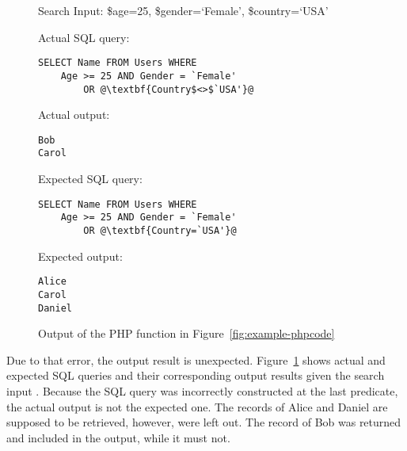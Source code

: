\begin{figure}[t]
    \centering
    \small
\begin{minipage}[t]{0.985\columnwidth}
Search Input: \textsf{\$age=25, \$gender=`Female', \$country=`USA'}
\end{minipage}

\vspace{4pt}
\begin{minipage}[t]{0.63\columnwidth}
Actual SQL query:
\begin{lstlisting}[numbers=none,xleftmargin=4pt]
SELECT Name FROM Users WHERE
    Age >= 25 AND Gender = `Female'
        OR @\textbf{Country$<>$`USA'}@
\end{lstlisting}
\end{minipage}
\hspace{0.03\columnwidth}
\begin{minipage}[t]{0.30\columnwidth}
Actual output:
\begin{lstlisting}[numbers=none,xleftmargin=4pt]
Bob
Carol
\end{lstlisting}
\end{minipage}

\begin{minipage}[t]{0.63\columnwidth}
Expected SQL query:
\begin{lstlisting}[numbers=none,xleftmargin=4pt]
SELECT Name FROM Users WHERE
    Age >= 25 AND Gender = `Female'
        OR @\textbf{Country=`USA'}@
\end{lstlisting}
\end{minipage}
\hspace{0.03\columnwidth}
\begin{minipage}[t]{0.30\columnwidth}
Expected output:
\begin{lstlisting}[numbers=none,xleftmargin=4pt]
Alice
Carol
Daniel
\end{lstlisting}
\end{minipage}
%
    \caption{Output of the PHP function in Figure~\ref{fig:example-phpcode}~\cite{icsm13}}\label{fig:example-output}
\end{figure}


Due to that error, the output result is
unexpected. Figure~\ref{fig:example-output} shows actual and expected
SQL queries and their corresponding output results given the search
input . Because
the SQL query was incorrectly constructed at the last predicate, the
actual output is not the expected one. The records of Alice and Daniel
are supposed to be retrieved, however, were left out. The record of
Bob was returned and included in the output, while it must not.

